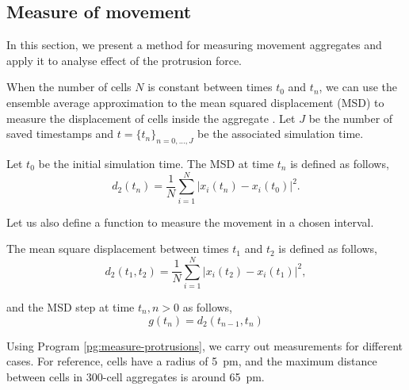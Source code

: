 \subsection{Measure of movement}

In this section, we present a method for measuring movement aggregates and apply it to analyse effect of the protrusion force.

When the number of cells $N$ is constant between times $t_0$ and $t_n$, we can use the ensemble average approximation to the mean squared displacement (MSD) to measure the displacement of cells inside the aggregate \parencite{Rosen_2021}. Let $J$ be the number of saved timestamps and $t=\{t_n\}_{n=0,...,J}$ be the associated simulation time.

\begin{definition}
    Let $t_0$ be the initial simulation time. The MSD at time $t_n$ is defined as follows,
    \begin{equation}
        d_2(t_n) = \frac{1}{N}\sum^{N}_{i=1}\left|x_i(t_n)-x_i(t_0)\right|^2.
    \end{equation}
\end{definition}

Let us also define a function to measure the movement in a chosen interval.
\begin{definition}
    The mean square displacement between times $t_1$ and $t_2$  is defined as follows,
    \begin{equation}
        d_2(t_1,t_2) = \frac{1}{N}\sum^{N}_{i=1}\left|x_i(t_2)-x_i(t_1)\right|^2,
    \end{equation}

    and the MSD step at time $t_n, n>0$ as follows,
    \begin{equation}
        g(t_n) = d_2(t_{n-1}, t_n)
    \end{equation}
\end{definition}

Using Program \ref{pg:measure-protrusions}, we carry out measurements for different cases. For reference, cells have a radius of \SI{5}{\pico\meter}, and the maximum distance between cells in 300-cell aggregates is around \SI{65}{\pico\meter}.

